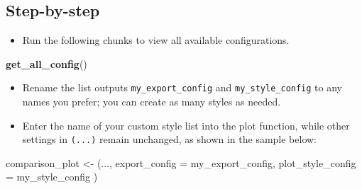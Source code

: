 \documentclass[
]{article}
\newenvironment{Shaded}{\begin{snugshade}}{\end{snugshade}}
\newcommand{\AttributeTok}[1]{\textcolor[rgb]{0.13,0.29,0.53}{#1}}
\newcommand{\FunctionTok}[1]{\textcolor[rgb]{0.13,0.29,0.53}{\textbf{#1}}}
\newcommand{\NormalTok}[1]{#1}
\newcommand{\OtherTok}[1]{\textcolor[rgb]{0.56,0.35,0.01}{#1}}
\providecommand{\tightlist}{%
  \setlength{\itemsep}{0pt}\setlength{\parskip}{0pt}}
\begin{document}
\subsection*{Step-by-step}\label{step-by-step}

\begin{itemize}
\tightlist
\item
  Run the following chunks to view all available configurations.
\end{itemize}

\begin{Shaded}
\begin{Highlighting}[]
\FunctionTok{get\_all\_config}\NormalTok{()}
\end{Highlighting}
\end{Shaded}

\begin{itemize}
\item
  Rename the list outputs \texttt{my\_export\_config} and
  \texttt{my\_style\_config} to any names you prefer; you can create as
  many styles as needed.
\item
  Enter the name of your custom style list into the plot function, while
  other settings in \texttt{(...)} remain unchanged, as shown in the
  sample below:
\end{itemize}

\begin{Shaded}
\begin{Highlighting}[]
\NormalTok{comparison\_plot }\OtherTok{\textless{}{-}}\NormalTok{ (...,}
                    \AttributeTok{export\_config =}\NormalTok{ my\_export\_config,}
                    \AttributeTok{plot\_style\_config =}\NormalTok{ my\_style\_config}
\NormalTok{                    )}
\end{Highlighting}
\end{Shaded}
\end{document}
